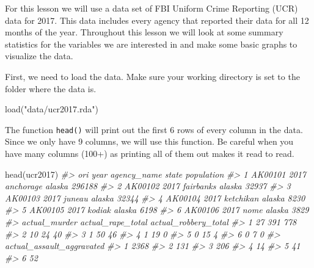 \documentclass[
]{krantz}
\makeatletter
\newenvironment{Shaded}{\begin{snugshade}}{\end{snugshade}}
\newcommand{\CommentTok}[1]{\textcolor[rgb]{0.37,0.37,0.37}{\textit{#1}}}
\newcommand{\FunctionTok}[1]{\textcolor[rgb]{0,0,0}{#1}}
\newcommand{\NormalTok}[1]{#1}
\newcommand{\StringTok}[1]{\textcolor[rgb]{0.5,0.5,0.5}{#1}}
\newenvironment{kframe}{%
\medskip{}
\setlength{\fboxsep}{.8em}
 \def\at@end@of@kframe{}%
 \ifinner\ifhmode%
  \def\at@end@of@kframe{\end{minipage}}%
  \begin{minipage}{\columnwidth}%
 \fi\fi%
 \def\FrameCommand##1{\hskip\@totalleftmargin \hskip-\fboxsep
 \colorbox{shadecolor}{##1}\hskip-\fboxsep
     \hskip-\linewidth \hskip-\@totalleftmargin \hskip\columnwidth}%
 \MakeFramed {\advance\hsize-\width
   \@totalleftmargin\z@ \linewidth\hsize
   \@setminipage}}%
 {\par\unskip\endMakeFramed%
 \at@end@of@kframe}
\renewenvironment{Shaded}{\begin{kframe}}{\end{kframe}}
\makeatother
\begin{document}
For this lesson we will use a data set of FBI Uniform Crime Reporting (UCR) data for 2017. This data includes every agency that reported their data for all 12 months of the year. Throughout this lesson we will look at some summary statistics for the variables we are interested in and make some basic graphs to visualize the data.

First, we need to load the data. Make sure your working directory is set to the folder where the data is.

\begin{Shaded}
\begin{Highlighting}[]
\FunctionTok{load}\NormalTok{(}\StringTok{"data/ucr2017.rda"}\NormalTok{)}
\end{Highlighting}
\end{Shaded}

The function \texttt{head()} will print out the first 6 rows of every column in the data. Since we only have 9 columns, we will use this function. Be careful when you have many columns (100+) as printing all of them out makes it read to read.

\begin{Shaded}
\begin{Highlighting}[]
\FunctionTok{head}\NormalTok{(ucr2017)}
\CommentTok{\#\textgreater{}       ori year agency\_name  state population}
\CommentTok{\#\textgreater{} 1 AK00101 2017   anchorage alaska     296188}
\CommentTok{\#\textgreater{} 2 AK00102 2017   fairbanks alaska      32937}
\CommentTok{\#\textgreater{} 3 AK00103 2017      juneau alaska      32344}
\CommentTok{\#\textgreater{} 4 AK00104 2017   ketchikan alaska       8230}
\CommentTok{\#\textgreater{} 5 AK00105 2017      kodiak alaska       6198}
\CommentTok{\#\textgreater{} 6 AK00106 2017        nome alaska       3829}
\CommentTok{\#\textgreater{}   actual\_murder actual\_rape\_total actual\_robbery\_total}
\CommentTok{\#\textgreater{} 1            27               391                  778}
\CommentTok{\#\textgreater{} 2            10                24                   40}
\CommentTok{\#\textgreater{} 3             1                50                   46}
\CommentTok{\#\textgreater{} 4             1                19                    0}
\CommentTok{\#\textgreater{} 5             0                15                    4}
\CommentTok{\#\textgreater{} 6             0                 7                    0}
\CommentTok{\#\textgreater{}   actual\_assault\_aggravated}
\CommentTok{\#\textgreater{} 1                      2368}
\CommentTok{\#\textgreater{} 2                       131}
\CommentTok{\#\textgreater{} 3                       206}
\CommentTok{\#\textgreater{} 4                        14}
\CommentTok{\#\textgreater{} 5                        41}
\CommentTok{\#\textgreater{} 6                        52}
\end{Highlighting}
\end{Shaded}
\end{document}
